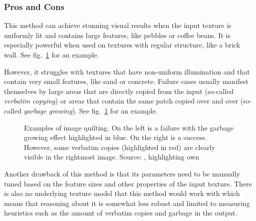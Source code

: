 \subsubsection{Pros and Cons}
\label{section:background-texture_synthesis-patch_based-pros_and_cons}

This method can achieve stunning visual results when the input texture is uniformly lit and contains large features, like pebbles or coffee beans. It is especially powerful when used on textures with regular structure, like a brick wall. See fig.~\ref{fig:background_quilting_pros_cons} for an example.

However, it struggles with textures that have non-uniform illumination and that contain very small features, like sand or concrete. Failure cases usually manifest themselves by large areas that are directly copied from the input (so-called \textit{verbatim copying}) or areas that contain the same patch copied over and over (so-called \textit{garbage growing}). See fig.~\ref{fig:background_quilting_pros_cons} for an example.

\begin{figure}
    \centering
    \caption{Examples of image quilting. On the left is a failure with the garbage growing effect highlighted in blue. On the right is a success. However, some verbatim copies (highlighted in red) are clearly visible in the rightmost image. Source: \citet{Raad2018}, highlighting own}
    \label{fig:background_quilting_pros_cons}
\end{figure}

Another drawback of this method is that its parameters need to be manually tuned based on the feature sizes and other properties of the input texture. There is also no underlying texture model that this method would work with which means that reasoning about it is somewhat less robust and limited to measuring heuristics such as the amount of verbatim copies and garbage in the output.

